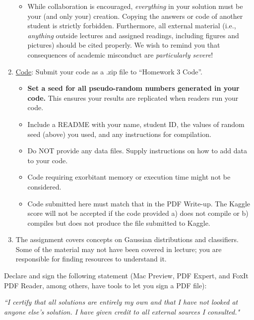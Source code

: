 \documentclass[11pt]{article}
\begin{document}
\begin{enumerate}[topsep=1pt]
\begin{itemize}[topsep=0pt, noitemsep]
		\item While collaboration is encouraged, \emph{everything} in your solution must
			be your (and only your) creation. Copying the answers or code of another student is strictly forbidden. Furthermore, all external material 
			(i.e., \emph{anything} outside lectures and assigned
			readings, including figures and pictures) should be cited properly.
			We wish to remind you that consequences of academic misconduct are
			\emph{particularly severe}!
	\end{itemize}

\item \underline{Code}: Submit your code as a .zip file 
	to ``Homework 3 Code''.
	\begin{itemize}[topsep=0pt, noitemsep]    
		\item \textbf{Set a seed for all pseudo-random numbers generated in your code.}
			This ensures your results are replicated when readers run your code.
		\item Include a README with your name, student ID,
			the values of random seed (above) you used, and any instructions
			for compilation.
		\item Do NOT provide any data files. Supply instructions on how to
			add data to your code.
		\item Code requiring exorbitant memory or execution time might not be considered.
		\item Code submitted here must match that in the PDF Write-up. The Kaggle score will not be accepted if the code provided a) does not compile or b) compiles
but does not produce the file submitted to Kaggle.
	\end{itemize}
	
	 \item The assignment covers concepts on Gaussian distributions and classifiers. Some of the material may not have been covered in lecture; you are responsible for finding resources to understand it.
\end{enumerate}



% 

Declare and sign the following statement (Mac Preview, PDF Expert, and FoxIt PDF Reader, among others, have tools to
let you sign a PDF file): 

\textit{``I certify that all solutions 
are entirely my own and that I have not looked at anyone else's solution. I have given credit to all external sources I consulted."}
\end{document}
